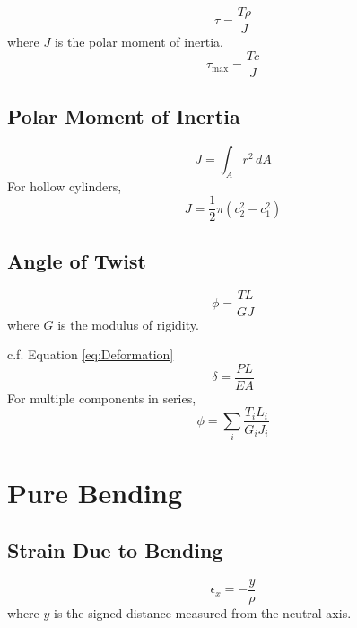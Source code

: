 \documentclass[twoside]{article}
\begin{document}
	\begin{equation}
		\tau = \frac{T \rho}{J}
		\label{eq:ShearingStressTwist}
	\end{equation}
	where $J$ is the polar moment of inertia.
	\begin{equation}
		\tau_\text{max} = \frac{Tc}{J}
		\label{eq:ShearingStressTwistMax}
	\end{equation}
	
	\subsection{Polar Moment of Inertia}
	\begin{equation}
		J = \int_A r^2 \, dA
		\label{eq:PolarMomentOfInertia}
	\end{equation}
	For hollow cylinders,
	\begin{equation}
		J = \frac{1}{2} \pi \left( c_2^2-c_1^2 \right)
		\label{eq:PolarMomentOfInertiaCylinder}
	\end{equation}
	
	\subsection{Angle of Twist}
	\begin{equation}
		\phi = \frac{TL}{GJ}
		\label{eq:AngleOfTwist}
	\end{equation}
	where $G$ is the modulus of rigidity.
	
	c.f. Equation \ref{eq:Deformation}
	\begin{equation*}
		\delta = \frac{PL}{EA}
	\end{equation*}
	For multiple components in series,
	\begin{equation}
		\phi = \sum_i \frac{T_i L_i}{G_i J_i}
		\label{eq:AngleOfTwistSeries}
	\end{equation}
	
	\newpage
	
	\section{Pure Bending}
	
	\subsection{Strain Due to Bending}
	
	\begin{equation}
		\epsilon_x = -\frac{y}{\rho}
		\label{eq:BendingStrain}
	\end{equation}
	where $y$ is the signed distance measured from the neutral axis.
	
\end{document}
